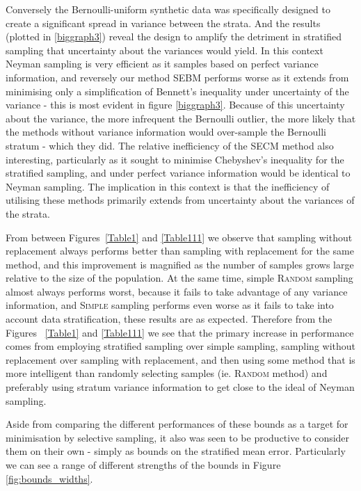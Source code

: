 Conversely the Bernoulli-uniform synthetic data was specifically designed to create a significant spread in variance between the strata.
And the results (plotted in \ref{biggraph3}) reveal the design to amplify the detriment in stratified sampling that uncertainty about the variances would yield.
In this context Neyman sampling is very efficient as it samples based on perfect variance information, and reversely our method SEBM performs worse as it extends from minimising only a simplification of Bennett's inequality under uncertainty of the variance - this is most evident in figure \ref{biggraph3}.
Because of this uncertainty about the variance, the more infrequent the Bernoulli outlier, the more likely that the methods without variance information would over-sample the Bernoulli stratum - which they did.
The relative inefficiency of the SECM method also interesting, particularly as it sought to minimise Chebyshev's inequality for the stratified sampling, and under perfect variance information would be identical to Neyman sampling.
The implication in this context is that the inefficiency of utilising these methods primarily extends from uncertainty about the variances of the strata.

From between Figures~\ref{Table1} and \ref{Table111} we observe that sampling without replacement always performs better than sampling with replacement for the same method, and this improvement is magnified as the number of samples grows large relative to the size of the population. 
At the same time, simple \textsc{Random} sampling almost always performs worst, because it fails to take advantage of any variance information, and \textsc{Simple} sampling performs even worse as it fails to take into account data stratification, these results are as expected.
Therefore from the Figures ~\ref{Table1} and \ref{Table111} we see that the primary increase in performance comes from employing stratified sampling over simple sampling, sampling without replacement over sampling with replacement, and then using some method that is more intelligent than randomly selecting samples (ie. \textsc{Random} method) and preferably using stratum variance information to get close to the ideal of Neyman sampling.

Aside from comparing the different performances of these bounds as a target for minimisation by selective sampling, it also was seen to be productive to consider them on their own - simply as bounds on the stratified mean error.
Particularly we can see a range of different strengths of the bounds in Figure \ref{fig:bounds_widths}.

